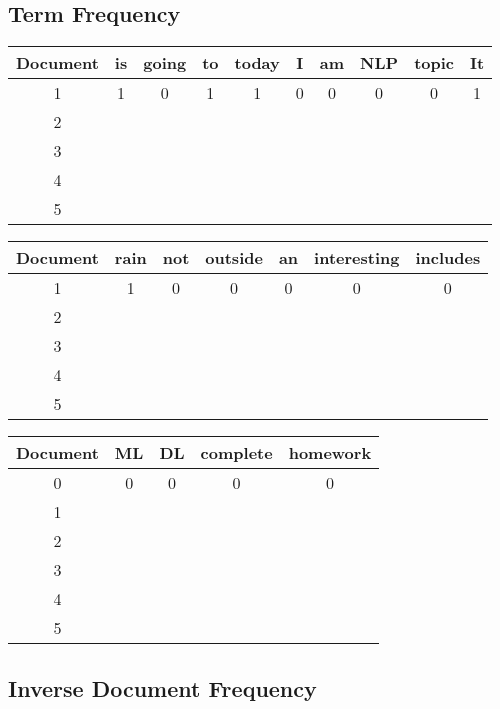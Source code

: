 \subsection{Term Frequency}
{\small
\begin{tabular}{|| c ||c c c c c c c c c |} 
	\hline
Document 	 & is &	going &	to &	today &	I &	am &	NLP &	topic &	It 		\\
\hline
\hline
	1 &	1 &	0 &	1 &	1 &	0 &	0 &	0 &	0 &	1	\\
2\\
3\\
4\\
5\\
\hline
\end{tabular}

\begin{tabular}{|| c|| c c c c c c |}
\hline
Document &rain &not &outside &an &interesting &	includes  \\
\hline
\hline
	1 &	1 & 0 &	0 &	0 &	0 &	0 	\\
2\\
3\\
4\\
5\\
\hline
\end{tabular}

\begin{tabular}{|| c|| c c c c |}
\hline
Document &ML&DL &complete &homework\\
\hline
\hline
	0 &	0 &	0 &	0 &	0 	\\
1\\
2\\
3\\
4\\
5\\
\hline
\end{tabular}
}
\subsection{Inverse Document Frequency}

